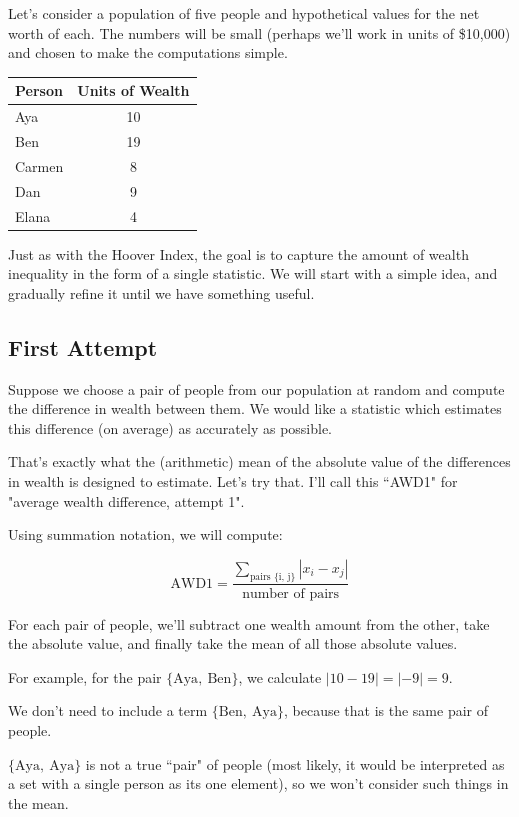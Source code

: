 \documentclass[12pt]{memoir}\usepackage[]{graphicx}\usepackage[table]{xcolor}
\begin{document}
Let's consider a population of five people and hypothetical values 
for the net worth of each.  The numbers will be small (perhaps we'll work in 
units of \$10{,}000) and chosen to make the computations simple. 

\begin{center}
\begin{tabular}{lc}
\toprule
Person & Units of Wealth \\ \midrule
Aya & 10 \\ \midrule
Ben & 19 \\ \midrule 
Carmen & 8 \\ \midrule
Dan & 9 \\ \midrule
Elana & 4 \\ 
\bottomrule
\end{tabular}
\end{center}
 
Just as with the Hoover Index, the goal is to capture the amount of wealth inequality
in the form of a single statistic.  We will start with a simple idea, and gradually refine it until
we have something useful. 

\subsection*{First Attempt}  Suppose we choose a pair of people from our population at 
random and compute the difference in wealth between them.  We would like a
statistic which estimates this difference (on average) as accurately as possible.

That's exactly what the (arithmetic) mean of the absolute value of the differences
in wealth is designed to estimate.  Let's try that.  I'll call this ``AWD1"
for "average wealth difference, attempt 1".

Using summation notation, we will compute: 

$$\text{AWD1} = \dfrac{\displaystyle\sum_{\text{pairs \{i, j\}}} |x_i - x_j|}{\text{number of pairs}}$$

For each pair of people, we'll subtract one wealth amount from the other, take the absolute value,
and finally take the mean of all those absolute values.  

For example, for the pair $\{\text{Aya},\ \text{Ben}\}$, we calculate $|10 - 19| = |-9| = 9$.  

We don't need to include a term $\{\text{Ben},\ \text{Aya}\}$, because that is the same
pair of people.  

$\{\text{Aya},\ \text{Aya}\}$ is not a true ``pair" of people (most likely, it would be
interpreted as a set with a single person as its one element), so we won't consider such things in the mean. 
\end{document}
